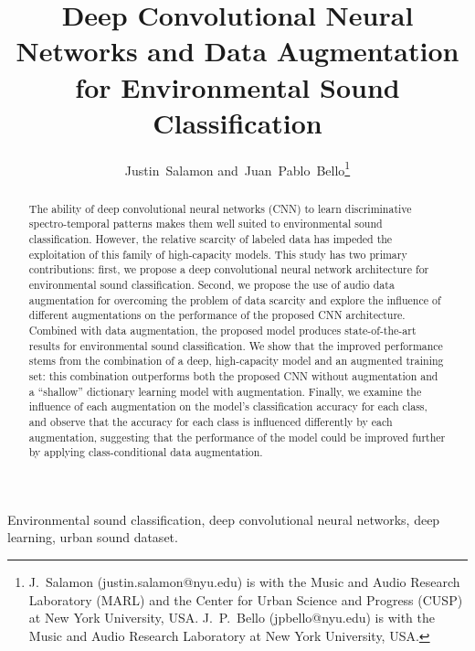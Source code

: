 \documentclass[journal,pdf]{IEEEtran}
\begin{document}
\title{Deep Convolutional Neural Networks and Data Augmentation for Environmental Sound Classification}

\author{Justin~Salamon 
        and~Juan~Pablo~Bello\thanks{J.~Salamon (justin.salamon@nyu.edu) is with the Music and Audio Research Laboratory (MARL) and the Center for Urban Science and Progress (CUSP) at New York University, USA. J.~P.~Bello (jpbello@nyu.edu) is with the Music and Audio Research Laboratory at New York University, USA.}
}


\maketitle

\begin{abstract}
The ability of deep convolutional neural networks (CNN) to learn discriminative spectro-temporal patterns makes them well suited to environmental sound classification. However, the relative scarcity of labeled data has impeded the exploitation of this family of high-capacity models.
This study has two primary contributions: first, we propose a deep convolutional neural network architecture 
for environmental sound classification. Second, we propose the use of audio data augmentation for overcoming the problem of data scarcity and explore the influence of different augmentations on the performance of the proposed CNN architecture.
Combined with data augmentation, the proposed model produces state-of-the-art results for environmental sound classification. We show that the improved performance stems from the combination of a deep, high-capacity model and an augmented training set: this combination outperforms both the proposed CNN without augmentation and a ``shallow'' dictionary learning model with augmentation. Finally, we examine the influence of each augmentation on the model's classification accuracy for each class, and observe that the accuracy for each class is influenced differently by each augmentation, suggesting that the performance of the model could be improved further by applying class-conditional data augmentation.
\end{abstract}

\begin{IEEEkeywords}
Environmental sound classification, deep convolutional neural networks, deep learning, urban sound dataset.
\end{IEEEkeywords}
\end{document}
